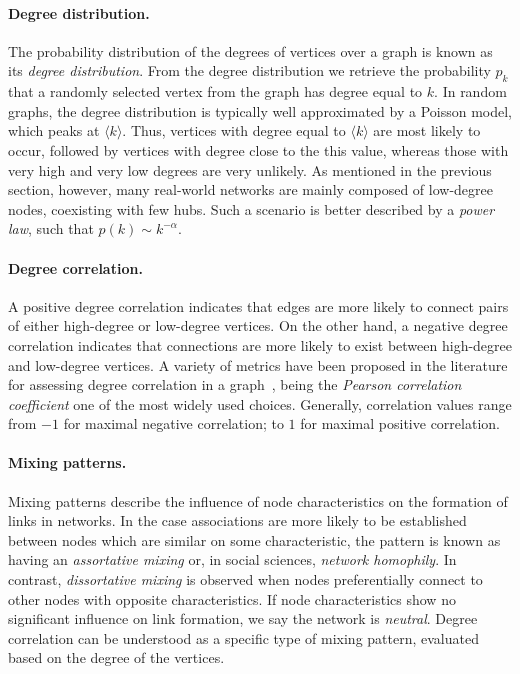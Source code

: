 \paragraph*{Degree distribution.}
The probability distribution of the degrees of vertices over a graph is known as its \textit{degree distribution}.
From the degree distribution we retrieve the probability $p_k$ that a randomly selected vertex from the graph has degree equal to $k$.
In random graphs, the degree distribution is typically well approximated by a Poisson model, which peaks at $\langle k \rangle$.
Thus, vertices with degree equal to $\langle k \rangle$ are most likely to occur, followed by vertices with degree close to the this value, whereas those with very high and very low degrees are very unlikely. 
As mentioned in the previous section, however, many real-world networks are mainly composed of low-degree nodes, coexisting with few hubs.
Such a scenario is better described by a \textit{power law}, such that $p(k) \sim k^{-\alpha}$.

\paragraph*{Degree correlation.}
A positive degree correlation indicates that edges are more likely to connect pairs of either high-degree or low-degree vertices.
On the other hand, a negative degree correlation indicates that connections are more likely to exist between high-degree and low-degree vertices.
A variety of metrics have been proposed in the literature for assessing degree correlation in a graph~\cite{Newman2003b}, being the \textit{Pearson correlation coefficient} one of the most widely used choices. Generally, correlation values range from $-1$ for maximal negative correlation; to $1$ for maximal positive correlation. 

\paragraph*{Mixing patterns.}
Mixing patterns describe the influence of node characteristics on the formation of links in networks.
In the case associations are more likely to be established between nodes which are similar on some characteristic, the pattern is known as having an \textit{assortative mixing} or, in social sciences, \textit{network homophily}.
In contrast, \textit{dissortative mixing} is observed when nodes preferentially connect to other nodes with opposite characteristics. 
If node characteristics show no significant influence on link formation, we say the network is \textit{neutral}.
Degree correlation can be understood as a specific type of mixing pattern, evaluated based on the degree of the vertices.

